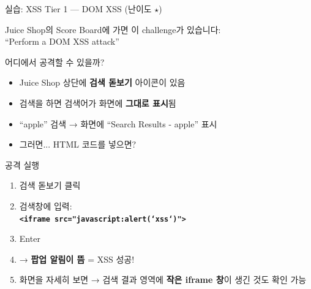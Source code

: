 \documentclass[aspectratio=169,10pt]{beamer}
\newcommand{\hlt}[1]{\textcolor{accent}{\textbf{#1}}}
\newcommand{\red}[1]{\textcolor{redTeam}{\textbf{#1}}}
\begin{document}
\begin{frame}{실습: XSS Tier 1 — DOM XSS (난이도 $\star$)}

Juice Shop의 Score Board에 가면 이 challenge가 있습니다:\\
``Perform a DOM XSS attack''

\vspace{0.3em}
\begin{block}{어디에서 공격할 수 있을까?}
\begin{itemize}
    \item Juice Shop 상단에 \textbf{검색 돋보기} 아이콘이 있음
    \item 검색을 하면 검색어가 화면에 \hlt{그대로 표시}됨
    \item ``apple'' 검색 → 화면에 ``Search Results - apple'' 표시
    \item 그러면... HTML 코드를 넣으면?
\end{itemize}
\end{block}

\vspace{0.3em}
\begin{block}{공격 실행}
\begin{enumerate}
    \item 검색 돋보기 클릭
    \item 검색창에 입력:\\[0.2em]
          {\footnotesize\texttt{\red{<iframe src="javascript:alert(`xss`)">}}}
    \item Enter
    \item → \hlt{팝업 알림이 뜸} = XSS 성공!
    \item 화면을 자세히 보면 → 검색 결과 영역에 \hlt{작은 iframe 창}이 생긴 것도 확인 가능
\end{enumerate}
\end{block}
\end{frame}
\end{document}
